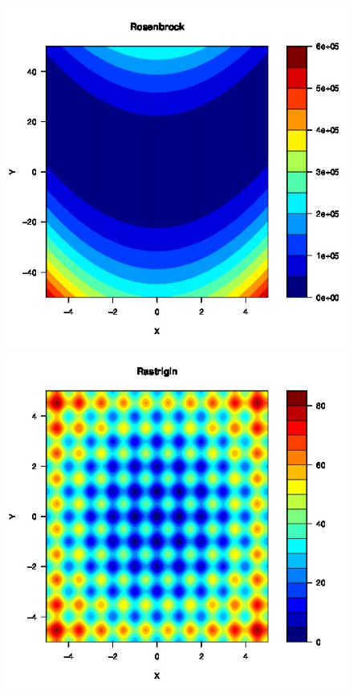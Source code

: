 \documentclass{article}
\begin{document}
\clearpage

\begin{figure}
        \begin{center}
                \begin{minipage}[h!]{0.49\textwidth}
                        \includegraphics[width=1.0\textwidth]{roseGuesses.jpg}
                \end{minipage}
                \begin{minipage}[h!]{0.49\textwidth}
                        \includegraphics[width=1.0\textwidth]{rastGuesses.jpg}
                \end{minipage}
        \end{center}
\end{figure}
\end{document}
